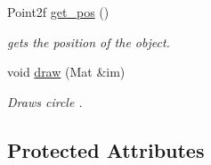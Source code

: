 \begin{DoxyCompactItemize}
Point2f \hyperlink{class_c_game_object_a065bd87e038fcbf7c84694a426b16773}{get\+\_\+pos} ()
\begin{DoxyCompactList}\small\item\em gets the position of the object. \end{DoxyCompactList}\item 
void \hyperlink{class_c_game_object_a4cb82332eb6e3e8878eb911f6d431ebe}{draw} (Mat \&im)
\begin{DoxyCompactList}\small\item\em Draws circle . \end{DoxyCompactList}\end{DoxyCompactItemize}
\subsection*{Protected Attributes}
